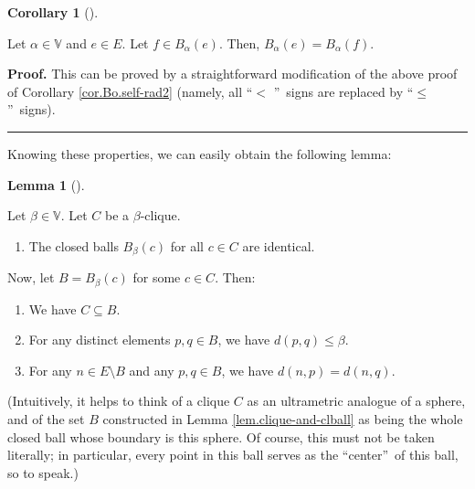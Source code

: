 \documentclass[numbers=enddot,12pt,final,onecolumn,notitlepage]{scrartcl}%
\theoremstyle{definition}
\newtheorem{lem}[theo]{Lemma}
\newenvironment{lemma}[1][]
{\begin{lem}[#1]\begin{leftbar}}
{\end{leftbar}\end{lem}}
\newtheorem{coro}[theo]{Corollary}
\newenvironment{corollary}[1][]
{\begin{coro}[#1]\begin{leftbar}}
{\end{leftbar}\end{coro}}
\newenvironment{proof}[1][Proof]{\noindent\textbf{#1.} }{\ \rule{0.5em}{0.5em}}
\renewcommand{\leq}{\leqslant}
\theoremstyle{plainsl}
\begin{document}
\begin{corollary}
\label{cor.Bc.self-rad2}Let $\alpha\in\mathbb{V}$ and $e\in E$. Let $f\in
B_{\alpha}\left(  e\right)  $. Then, $B_{\alpha}\left(  e\right)  =B_{\alpha
}\left(  f\right)  $.
\end{corollary}

\begin{proof}
This can be proved by a straightforward modification of the above proof of
Corollary \ref{cor.Bo.self-rad2} (namely, all \textquotedblleft$<$%
\textquotedblright\ signs are replaced by \textquotedblleft$\leq
$\textquotedblright\ signs).
\end{proof}

Knowing these properties, we can easily obtain the following lemma:

\begin{lemma}
\label{lem.clique-and-clball}Let $\beta\in\mathbb{V}$. Let $C$ be a $\beta$-clique.

\begin{enumerate}
\item[\textbf{(a)}] The closed balls $B_{\beta}\left(  c\right)  $ for all
$c\in C$ are identical.
\end{enumerate}

Now, let $B=B_{\beta}\left(  c\right)  $ for some $c\in C$. Then:

\begin{enumerate}
\item[\textbf{(b)}] We have $C\subseteq B$.

\item[\textbf{(c)}] For any distinct elements $p,q\in B$, we have $d\left(
p,q\right)  \leq\beta$.

\item[\textbf{(d)}] For any $n\in E\setminus B$ and any $p,q\in B$, we have
$d\left(  n,p\right)  =d\left(  n,q\right)  $.
\end{enumerate}
\end{lemma}

(Intuitively, it helps to think of a clique $C$ as an ultrametric analogue of
a sphere, and of the set $B$ constructed in Lemma \ref{lem.clique-and-clball}
as being the whole closed ball whose boundary is this sphere. Of course, this
must not be taken literally; in particular, every point in this ball serves as
the \textquotedblleft center\textquotedblright\ of this ball, so to speak.)
\end{document}
